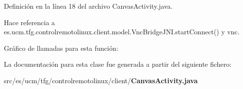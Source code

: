 Definición en la línea 18 del archivo Canvas\-Activity.\-java.



Hace referencia a es.\-ucm.\-tfg.\-controlremotolinux.\-client.\-model.\-Vnc\-Bridge\-J\-N\-I.\-start\-Connect() y vnc.



Gráfico de llamadas para esta función\-:




La documentación para esta clase fue generada a partir del siguiente fichero\-:\begin{DoxyCompactItemize}
\item 
src/es/ucm/tfg/controlremotolinux/client/{\bf Canvas\-Activity.\-java}\end{DoxyCompactItemize}
